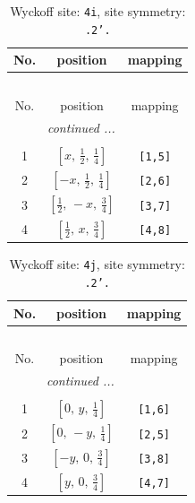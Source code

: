 \documentclass[fleqn,8pt]{jsarticle}
\begin{document}
\renewcommand{\arraystretch}{1.2}
\begin{longtable}{ccc}
\caption{Wyckoff site: {\tt 4i}, site symmetry: {\tt .2'.}}
 \\
 \hline \hline
No. & position & mapping \\ \hline \endfirsthead

\multicolumn{2}{l}{\tablename\ \thetable{}} \\
 \hline \hline
No. & position & mapping \\ \hline \endhead

 \hline \hline
\multicolumn{2}{r}{\footnotesize\it continued ...} \\ \endfoot

 \hline \hline
\multicolumn{2}{r}{} \\ \endlastfoot

1 & $\left[ x,\, \frac{1}{2},\, \frac{1}{4} \right]$ & {\tt [1,5]} \\ \hline
2 & $\left[ - x,\, \frac{1}{2},\, \frac{1}{4} \right]$ & {\tt [2,6]} \\ \hline
3 & $\left[ \frac{1}{2},\, - x,\, \frac{3}{4} \right]$ & {\tt [3,7]} \\ \hline
4 & $\left[ \frac{1}{2},\, x,\, \frac{3}{4} \right]$ & {\tt [4,8]} \\
\end{longtable}
\renewcommand{\arraystretch}{1.2}
\begin{longtable}{ccc}
\caption{Wyckoff site: {\tt 4j}, site symmetry: {\tt .2'.}}
 \\
 \hline \hline
No. & position & mapping \\ \hline \endfirsthead

\multicolumn{2}{l}{\tablename\ \thetable{}} \\
 \hline \hline
No. & position & mapping \\ \hline \endhead

 \hline \hline
\multicolumn{2}{r}{\footnotesize\it continued ...} \\ \endfoot

 \hline \hline
\multicolumn{2}{r}{} \\ \endlastfoot

1 & $\left[ 0,\, y,\, \frac{1}{4} \right]$ & {\tt [1,6]} \\ \hline
2 & $\left[ 0,\, - y,\, \frac{1}{4} \right]$ & {\tt [2,5]} \\ \hline
3 & $\left[ - y,\, 0,\, \frac{3}{4} \right]$ & {\tt [3,8]} \\ \hline
4 & $\left[ y,\, 0,\, \frac{3}{4} \right]$ & {\tt [4,7]} \\
\end{longtable}
\end{document}
